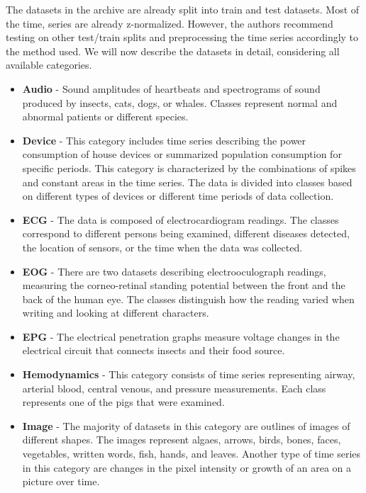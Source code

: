 \documentclass[a4paper,11pt,twoside]{report}
\theoremstyle{definition}
\begin{document}
The datasets in the archive are already split into train and test datasets. Most of the time, series are already z-normalized. However, the authors recommend testing on other test/train splits and preprocessing the time series accordingly to the method used. We will now describe the datasets in detail, considering all available categories.

\begin{itemize}
\item \textbf{Audio} - Sound amplitudes of heartbeats and spectrograms of sound produced by insects, cats, dogs, or whales. Classes represent normal and abnormal patients or different species.

\item \textbf{Device} - This category includes time series describing the power consumption of house devices or summarized population consumption for specific periods. This category is characterized by the combinations of spikes and constant areas in the time series. The data is divided into classes based on different types of devices or different time periods of data collection.

\item \textbf{ECG} - The data is composed of electrocardiogram readings. The classes correspond to different persons being examined, different diseases detected, the location of sensors, or the time when the data was collected.

\item \textbf{EOG} - There are two datasets describing electrooculograph readings, measuring the corneo-retinal standing potential between the front and the back of the human eye. The classes distinguish how the reading varied when writing and looking at different characters.
\item \textbf{EPG} - The electrical penetration graphs measure voltage changes in the electrical circuit that connects insects and their food source.
\item \textbf{Hemodynamics} - This category consists of time series representing airway, arterial blood, central venous, and pressure measurements. Each class represents one of the pigs that were examined.

\item \textbf{Image} - The majority of datasets in this category are outlines of images of different shapes. The images represent algaes, arrows, birds, bones, faces, vegetables, written words, fish, hands, and leaves. Another type of time series in this category are changes in the pixel intensity or growth of an area on a picture over time.


\end{itemize}
\end{document}
